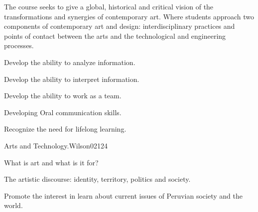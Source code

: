 \begin{syllabus}


\begin{justification}
The course seeks to give a global, historical and critical vision of the transformations and synergies of contemporary art. Where students approach two components of contemporary art and design: interdisciplinary practices and points of contact between the arts and the technological and engineering processes.
\end{justification}

\begin{goals}
    \item Develop the ability to analyze information.
    \item Develop the ability to interpret information.
    \item Develop the ability to work as a team.
    \item Developing Oral communication skills.
    \item Recognize the need for lifelong learning.   
\end{goals}

\begin{outcomes}
    \item {} %
    \item {} %
    \item {} %
    \item {} %
    \item {} %
\end{outcomes}

\begin{competences}
    \item {}
    \item {}
    \item {}
    \item {}
\end{competences}

\begin{unit}{Arts and Technology.}{}{Wilson02}{12}{4}
   \begin{topics}
      \item What is art and what is it for?
      \item The artistic discourse: identity, territory, politics and society.
   \end{topics}
   \begin{learningoutcomes}
      \item Promote the  interest in learn about current issues of Peruvian society and the world.
   \end{learningoutcomes}
\end{unit}


\end{syllabus}
